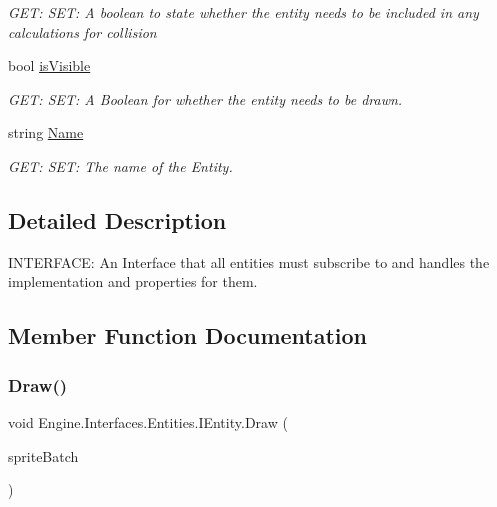 \begin{DoxyCompactItemize}
\begin{DoxyCompactList}\small\item\em G\+ET\+: S\+ET\+: A boolean to state whether the entity needs to be included in any calculations for collision \end{DoxyCompactList}\item 
bool \hyperlink{a00438_a6aa73f86c947c5c215b45f8f0cadb234}{is\+Visible}
\begin{DoxyCompactList}\small\item\em G\+ET\+: S\+ET\+: A Boolean for whether the entity needs to be drawn. \end{DoxyCompactList}\item 
string \hyperlink{a00438_a7a3927fc2320652f20b86e68544bc571}{Name}
\begin{DoxyCompactList}\small\item\em G\+ET\+: S\+ET\+: The name of the Entity. \end{DoxyCompactList}\end{DoxyCompactItemize}


\subsection{Detailed Description}
I\+N\+T\+E\+R\+F\+A\+CE\+: An Interface that all entities must subscribe to and handles the implementation and properties for them. 



\subsection{Member Function Documentation}
\mbox{\label{a00438_a845918af6647460d2c47a3853a30f95f}} 
\subsubsection{\texorpdfstring{Draw()}{Draw()}}
{\footnotesize\ttfamily void Engine.\+Interfaces.\+Entities.\+I\+Entity.\+Draw (\begin{DoxyParamCaption}\item[{Sprite\+Batch}]{sprite\+Batch }\end{DoxyParamCaption})}



